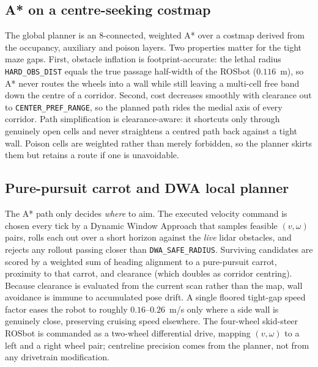 \documentclass[11pt,a4paper]{article}
\newcommand{\code}[1]{\colorbox{codegray}{\texttt{\small #1}}}
\begin{document}
\subsection{A* on a centre-seeking costmap}
The global planner is an 8-connected, weighted A* over a costmap derived from
the occupancy, auxiliary and poison layers. Two properties matter for the tight
maze gaps. First, obstacle inflation is footprint-accurate: the lethal radius
\code{HARD\_OBS\_DIST} equals the true passage half-width of the ROSbot
($0.116$~m), so A* never routes the wheels into a wall while still leaving a
multi-cell free band down the centre of a corridor. Second, cost decreases
smoothly with clearance out to \code{CENTER\_PREF\_RANGE}, so the planned path
rides the medial axis of every corridor. Path simplification is
clearance-aware: it shortcuts only through genuinely open cells and never
straightens a centred path back against a tight wall. Poison cells are weighted
rather than merely forbidden, so the planner skirts them but retains a route if
one is unavoidable.

\subsection{Pure-pursuit carrot and DWA local planner}
The A* path only decides \emph{where} to aim. The executed velocity command is
chosen every tick by a Dynamic Window Approach that samples feasible
$(v,\omega)$ pairs, rolls each out over a short horizon against the
\emph{live} lidar obstacles, and rejects any rollout passing closer than
\code{DWA\_SAFE\_RADIUS}. Surviving candidates are scored by a weighted sum of
heading alignment to a pure-pursuit carrot, proximity to that carrot, and
clearance (which doubles as corridor centring). Because clearance is evaluated
from the current scan rather than the map, wall avoidance is immune to
accumulated pose drift. A single floored tight-gap speed factor eases the robot
to roughly $0.16$--$0.26$~m/s only where a side wall is genuinely close,
preserving cruising speed elsewhere. The four-wheel skid-steer ROSbot is
commanded as a two-wheel differential drive, mapping $(v,\omega)$ to a left and
a right wheel pair; centreline precision comes from the planner, not from any
drivetrain modification.
\end{document}
